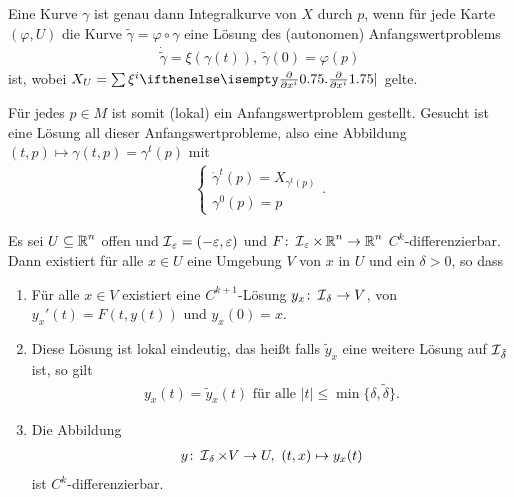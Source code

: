\begin{bem}
  Eine Kurve $\gamma$ ist genau dann Integralkurve von $X$ durch $p$, wenn für jede Karte $(\varphi,U)$ die Kurve $\tilde \gamma = \varphi \circ \gamma$ eine Lösung des (autonomen) Anfangswertproblems
  \begin{align*}
    \dot{\tilde \gamma} = \xi(\gamma(t)),  \ \tilde \gamma(0) = \varphi(p)
  \end{align*}
  ist, wobei $X_U = \sum \xi^i \pdifffrac{}{x^i}$ gelte.

  Für jedes $p \in M$ ist somit (lokal) ein Anfangswertproblem gestellt. Gesucht ist eine  Lösung all dieser Anfangswertprobleme, also eine Abbildung $(t,p) \mapsto \gamma(t,p) = \gamma^t(p)$ mit 
  \begin{align*}
    \begin{cases}
      \dot \gamma^t(p) = X_{\gamma^t(p)}\\
      \gamma^0(p) = p
    \end{cases}.
  \end{align*}
\end{bem}

\begin{Satz}\label{satz-4-6}
  Es sei $U \subseteq \operatorname{\mathbb{R}}^n$ offen und $\operatorname{\mathcal{I}}_{\varepsilon}=(-\varepsilon,\varepsilon)$ und $F \colon \operatorname{\mathcal{I}}_{\varepsilon} \times \operatorname{\mathbb{R}}^n \to \operatorname{\mathbb{R}}^n$ $C^k$-differenzierbar.
  Dann existiert für alle $x \in U$ eine Umgebung $V$ von $x$ in $U$ und ein $\delta > 0$, so dass
  \begin{enumerate}[label=(\roman*),leftmargin=*,widest=iii]
  \item Für alle $x \in V$ existiert eine $C^{k+1}$-Lösung $y_x\colon \operatorname{\mathcal{I}}_{\delta} \to V$, von $y_x'(t)=F(t,y(t))$ und $y_x(0) = x$.
  \item\label{satz-4-6-ii} Diese Lösung ist lokal eindeutig, das hei\ss t falls $\tilde y_x$ eine weitere Lösung auf $\operatorname{\mathcal{I}}_{\tilde\delta}$ ist, so gilt
    \begin{align*}
      y_x(t) = \tilde y_x(t) \text{ für alle } |t| \leq \min\{\delta, \tilde\delta\}.
    \end{align*}
  \item Die Abbildung 
    \begin{align*}
      y\colon \operatorname{\mathcal{I}}_{\delta} \times V \to U, \ (t,x) \mapsto y_x(t)
    \end{align*}
    ist $C^k$-differenzierbar.
  \end{enumerate}
\end{Satz}

